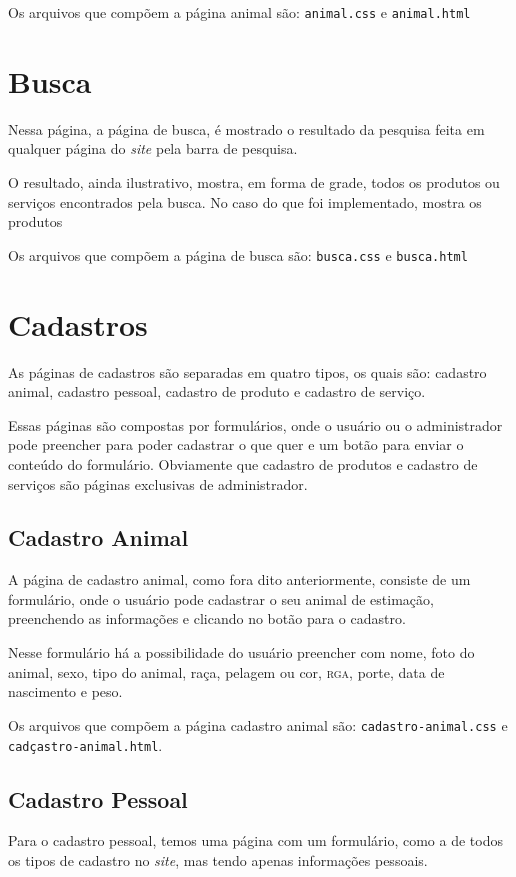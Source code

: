 Os arquivos que compõem a página animal são: \texttt{animal.css} e \texttt{animal.html}

\section{Busca}
Nessa página, a página de busca, é mostrado o resultado da pesquisa feita em qualquer página
do \emph{site} pela barra de pesquisa.

O resultado, ainda ilustrativo, mostra, em forma de grade, todos os produtos ou serviços
encontrados pela busca. No caso do que foi implementado, mostra os produtos

Os arquivos que compõem a página de busca são: \texttt{busca.css} e \texttt{busca.html}

\section{Cadastros}
As páginas de cadastros são separadas em quatro tipos, os quais são: cadastro animal,
cadastro pessoal, cadastro de produto e cadastro de serviço.

Essas páginas são compostas por formulários, onde o usuário ou o administrador pode preencher
para poder cadastrar o que quer e um botão para enviar o conteúdo do formulário. Obviamente
que cadastro de produtos e cadastro de serviços são páginas exclusivas de administrador.

\subsection{Cadastro Animal}
A página de cadastro animal, como fora dito anteriormente, consiste de um formulário,
onde o usuário pode cadastrar o seu animal de estimação, preenchendo as informações e
clicando no botão para o cadastro.

Nesse formulário há a possibilidade do usuário preencher com nome, foto do animal, sexo,
tipo do animal, raça, pelagem ou cor, \textsc{rga}, porte, data de nascimento e peso.

Os arquivos que compõem a página cadastro animal são: \texttt{cadastro-animal.css} e
\texttt{cadçastro-animal.html}.

\subsection{Cadastro Pessoal}
Para o cadastro pessoal, temos uma página com um formulário, como a de todos os tipos
de cadastro no \emph{site}, mas tendo apenas informações pessoais.

